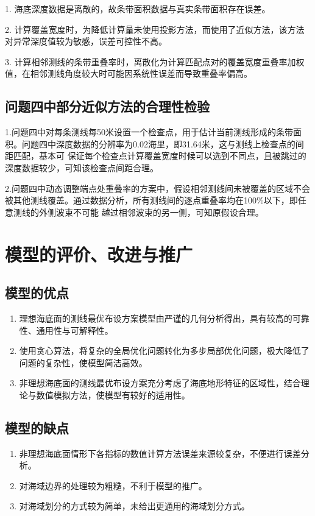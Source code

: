 \documentclass[withoutpreface,bwprint]{cumcmthesis} %
\begin{document}
        1. 海底深度数据是离散的，故条带面积数据与真实条带面积存在误差。

        2. 计算覆盖宽度时，为降低计算量未使用投影方法，而使用了近似方法，该方法对异常深度值较为敏感，误差可控性不高。
        
        3. 计算相邻测线的条带重叠率时，离散化为计算匹配点对的覆盖宽度重叠率加权值，在相邻测线角度较大时可能因系统性误差而导致重叠率偏高。

        \subsection{问题四中部分近似方法的合理性检验}
            1.问题四中对每条测线每50米设置一个检查点，用于估计当前测线形成的条带面积。问题四中深度数据的分辨率为0.02海里，即31.64米，这与测线上检查点的间距匹配，基本可
            保证每个检查点计算覆盖宽度时候可以选到不同点，且被跳过的深度数据较少，可知该检查点间距合理。
            
            2.问题四中动态调整端点处重叠率的方案中，假设相邻测线间未被覆盖的区域不会被其他测线覆盖。通过数据分析，所有测线间的逐点重叠率均在100\%以下，即任意测线的外侧波束不可能
            越过相邻波束的另一侧，可知原假设合理。
        
        


        \section{模型的评价、改进与推广}
        \subsection{模型的优点}
        \begin{enumerate}
            \item 理想海底面的测线最优布设方案模型由严谨的几何分析得出，具有较高的可靠性、通用性与可解释性。
            \item 使用贪心算法，将复杂的全局优化问题转化为多步局部优化问题，极大降低了问题的复杂性，使模型简洁高效。
            \item 非理想海底面的测线最优布设方案充分考虑了海底地形特征的区域性，结合理论与数值模拟方法，使模型有较好的适用性。
        \end{enumerate}

        \subsection{模型的缺点}
        \begin{enumerate}
            \item 非理想海底面情形下各指标的数值计算方法误差来源较复杂，不便进行误差分析。
            \item 对海域边界的处理较为粗糙，不利于模型的推广。
            \item 对海域划分的方式较为简单，未给出更通用的海域划分方式。
        \end{enumerate}
        
\end{document}
